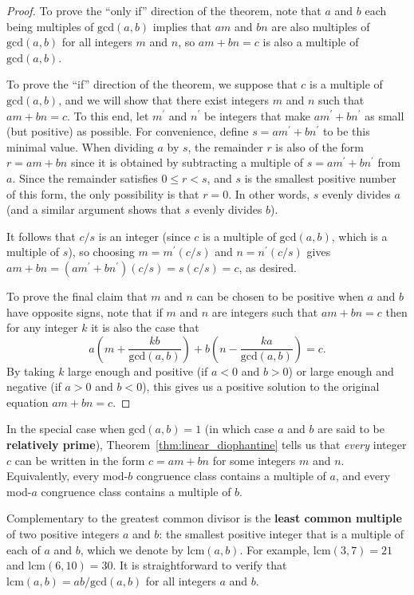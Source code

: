 \begin{proof}
	To prove the ``only if'' direction of the theorem, note that $a$ and $b$ each being multiples of $\mathrm{gcd}(a,b)$ implies that $am$ and $bn$ are also multiples of $\mathrm{gcd}(a,b)$ for all integers $m$ and $n$, so $am + bn = c$ is also a multiple of $\mathrm{gcd}(a,b)$.
	
	To prove the ``if'' direction of the theorem, we suppose that $c$ is a multiple of $\mathrm{gcd}(a,b)$, and we will show that there exist integers $m$ and $n$ such that $am + bn = c$. To this end, let $m^\prime$ and $n^\prime$ be integers that make $am^\prime + bn^\prime$ as small (but positive) as possible. For convenience, define $s = am^\prime + bn^\prime$ to be this minimal value. When dividing $a$ by $s$, the remainder $r$ is also of the form $r = am + bn$ since it is obtained by subtracting a multiple of $s = am^\prime + bn^\prime$ from $a$. Since the remainder satisfies $0 \leq r < s$, and $s$ is the smallest positive number of this form, the only possibility is that $r = 0$. In other words, $s$ evenly divides $a$ (and a similar argument shows that $s$ evenly divides $b$).
	
	It follows that $c/s$ is an integer (since $c$ is a multiple of $\mathrm{gcd}(a,b)$, which is a multiple of $s$), so choosing $m = m^\prime(c/s)$ and $n = n^\prime(c/s)$ gives $am + bn = (am^\prime + bn^\prime)(c/s) = s(c/s) = c$, as desired.
	
	To prove the final claim that $m$ and $n$ can be chosen to be positive when $a$ and $b$ have opposite signs, note that if $m$ and $n$ are integers such that $am + bn = c$ then for any integer $k$ it is also the case that
	\[
		a\left(m + \frac{kb}{\mathrm{gcd}(a,b)}\right) + b\left(n - \frac{ka}{\mathrm{gcd}(a,b)}\right) = c.
	\]
	By taking $k$ large enough and positive (if $a < 0$ and $b > 0$) or large enough and negative (if $a > 0$ and $b < 0$), this gives us a positive solution to the original equation $am + bn = c$.
\end{proof}

In the special case when $\mathrm{gcd}(a,b) = 1$ (in which case $a$ and $b$ are said to be \textbf{relatively prime}), Theorem~\ref{thm:linear_diophantine} tells us that \emph{every} integer $c$ can be written in the form $c = am + bn$ for some integers $m$ and $n$. Equivalently, every mod-$b$ congruence class contains a multiple of $a$, and every mod-$a$ congruence class contains a multiple of $b$.

Complementary to the greatest common divisor is the \textbf{least common multiple} of two positive integers $a$ and $b$: the smallest positive integer that is a multiple of each of $a$ and $b$, which we denote by $\mathrm{lcm}(a,b)$. For example, $\mathrm{lcm}(3,7) = 21$ and $\mathrm{lcm}(6,10) = 30$. It is straightforward to verify that $\mathrm{lcm}(a,b) = ab/\mathrm{gcd}(a,b)$ for all integers $a$ and $b$.



